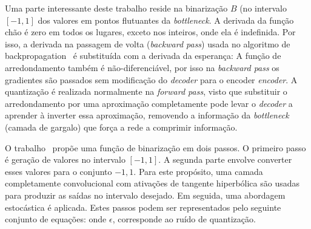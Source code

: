 

Uma parte interessante deste trabalho reside na binarização $B$ (no intervalo $[-1, 1]$ dos valores em pontos flutuantes da \textit{bottleneck}. A derivada da função chão é zero em todos os lugares, exceto nos inteiros, onde ela é indefinida. Por isso, a derivada na passagem de volta (\textit{backward pass}) usada no algoritmo de backpropagation~\cite{rumelhart1988learning} é substituída com a derivada da esperança: 
A função de arredondamento também é não-diferenciável, por isso na \textit{backward pass} os gradientes são passados sem modificação do \textit{decoder} para o encoder \textit{encoder}. A quantização é realizada normalmente na \textit{forward pass}, visto que substituir o arredondamento por uma aproximação completamente pode levar o \textit{decoder} a aprender à inverter essa aproximação, removendo a informação da \textit{bottleneck} (camada de gargalo) que força a rede a comprimir informação.

O trabalho~\cite{Variable2016Toderici} propõe uma função de binarização em dois passos. O primeiro passo é geração de valores no intervalo $[-1, 1]$. A segunda parte envolve converter esses valores para o conjunto ${-1, 1}$. Para este propósito, uma camada completamente convolucional com ativações de tangente hiperbólica são usadas para produzir as saídas no intervalo desejado. Em seguida, uma abordagem estocástica é aplicada. Estes passos podem ser representados pelo seguinte conjunto de equações:   onde $\epsilon$, corresponde ao ruído de quantização.

